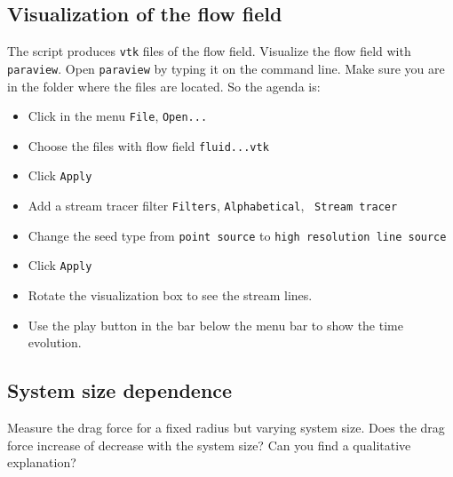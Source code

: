 \subsection*{Visualization of the flow field}
The script produces {\tt vtk} files of the flow field. Visualize the flow field
with {\tt paraview}. Open {\tt paraview} by typing it on the command line. Make
sure you are in the folder where the files are located. So the agenda is:
\begin{itemize}
	\item Click in the menu {\tt File}, {\tt Open...}
	\item Choose the files with flow field {\tt fluid...vtk}
	\item Click {\tt Apply}
	\item Add a stream tracer filter {\tt Filters}, {\tt Alphabetical}, {\tt
		Stream tracer}
	\item Change the seed type from {\tt point source} to {\tt high resolution
		line source}
	\item Click {\tt Apply}
	\item Rotate the visualization box to see the stream lines.
	\item Use the play button in the bar below the menu bar to show the time
		evolution.
\end{itemize}

\subsection*{System size dependence}
Measure the drag force for a fixed radius but varying system size. Does the drag
force increase of decrease with the system size? Can you find a qualitative
explanation?
